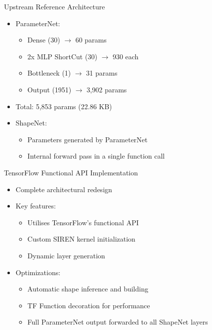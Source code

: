 \documentclass{beamer}
\begin{document}
\begin{frame}{Upstream Reference Architecture}
    \begin{itemize}
        \item ParameterNet:
        \begin{itemize}
            \item Dense (30) $\rightarrow$ 60 params
            \item 2x MLP ShortCut (30) $\rightarrow$ 930 each
            \item Bottleneck (1) $\rightarrow$ 31 params
            \item Output (1951) $\rightarrow$ 3,902 params
        \end{itemize}
        \item Total: 5,853 params (22.86 KB)
        \item ShapeNet:
        \begin{itemize}
            \item Parameters generated by ParameterNet
            \item Internal forward pass in a single function call
        \end{itemize}
    \end{itemize}
\end{frame}

\begin{frame}{TensorFlow Functional API Implementation}
    \begin{itemize}
        \item Complete architectural redesign
        \item Key features:
        \begin{itemize}
            \item Utilises TensorFlow's functional API
            \item Custom SIREN kernel initialization
            \item Dynamic layer generation
        \end{itemize}
        \item Optimizations:
        \begin{itemize}
            \item Automatic shape inference and building
            \item TF Function decoration for performance
            \item Full ParameterNet output forwarded to all ShapeNet layers
        \end{itemize}
    \end{itemize}
\end{frame}
\end{document}
